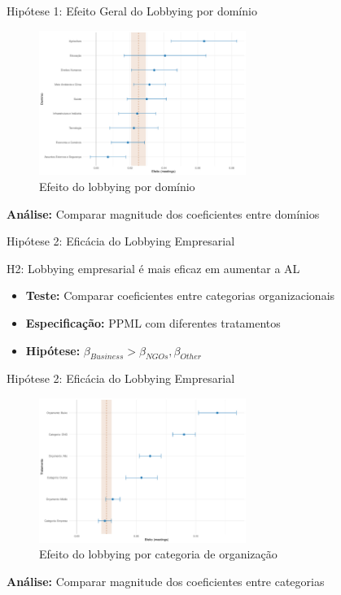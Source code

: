 \documentclass[aspectratio=169]{beamer}
\begin{document}
\begin{frame}{Hipótese 1: Efeito Geral do Lobbying por domínio}
  \begin{figure}
  \centering
  \includegraphics[width=0.6\textwidth]{figures/fig_coeff_domains.pdf}
  \caption{Efeito do lobbying por domínio}
  \end{figure}
  
  \textbf{Análise:} Comparar magnitude dos coeficientes entre domínios
\end{frame}




\begin{frame}{Hipótese 2: Eficácia do Lobbying Empresarial}
\begin{block}{H2: Lobbying empresarial é mais eficaz em aumentar a AL}
\begin{itemize}
\item \textbf{Teste:} Comparar coeficientes entre categorias organizacionais
\item \textbf{Especificação:} PPML com diferentes tratamentos
\item \textbf{Hipótese:} $\beta_{Business} > \beta_{NGOs}, \beta_{Other}$
\end{itemize}
\end{block}
\end{frame}

\begin{frame}{Hipótese 2: Eficácia do Lobbying Empresarial}
\begin{figure}
\centering
\includegraphics[width=0.6\textwidth]{figures/fig_coeff_treatments_overall.pdf}
\caption{Efeito do lobbying por categoria de organização}
\end{figure}

\textbf{Análise:} Comparar magnitude dos coeficientes entre categorias
\end{frame}
\end{document}
